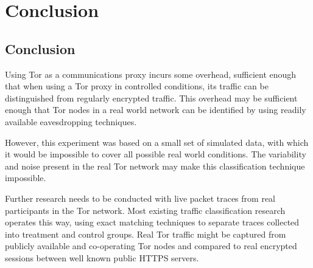 \chapter{Conclusion}

\section{Conclusion}

Using Tor as a communications proxy incurs some overhead, sufficient enough
that when using a Tor proxy in controlled conditions, its traffic can be
distinguished from regularly encrypted traffic. This overhead may be sufficient
enough that Tor nodes in a real world network can be identified by using
readily available eavesdropping techniques.

However, this experiment was based on a small set of simulated data, with which
it would be impossible to cover all possible real world conditions. The
variability and noise present in the real Tor network may make this
classification technique impossible.

Further research needs to be conducted with live packet traces from real
participants in the Tor network. Most existing traffic classification research
operates this way, using exact matching techniques to separate traces collected
into treatment and control groups. Real Tor traffic might be captured from
publicly available and co-operating Tor nodes and compared to real encrypted
sessions between well known public HTTPS servers.
